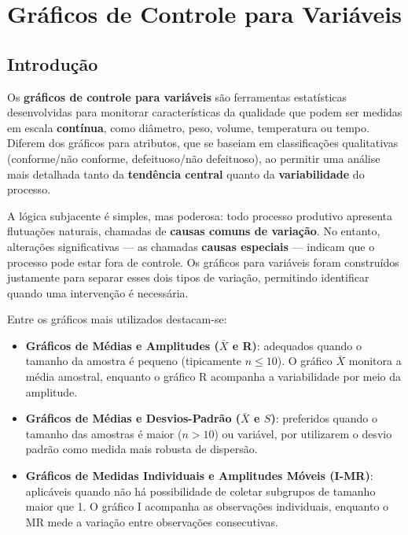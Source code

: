 \documentclass[
  portuguese,
  11pt,
  a4paper,
  DIV=11,
  numbers=noendperiod]{scrreprt}
\providecommand{\tightlist}{%
  \setlength{\itemsep}{0pt}\setlength{\parskip}{0pt}}
\begin{document}

\chapter{Gráficos de Controle para
Variáveis}\label{gruxe1ficos-de-controle-para-variuxe1veis}

\section{Introdução}\label{introduuxe7uxe3o}

Os \textbf{gráficos de controle para variáveis} são ferramentas
estatísticas desenvolvidas para monitorar características da qualidade
que podem ser medidas em escala \textbf{contínua}, como diâmetro, peso,
volume, temperatura ou tempo. Diferem dos gráficos para atributos, que
se baseiam em classificações qualitativas (conforme/não conforme,
defeituoso/não defeituoso), ao permitir uma análise mais detalhada tanto
da \textbf{tendência central} quanto da \textbf{variabilidade} do
processo.

A lógica subjacente é simples, mas poderosa: todo processo produtivo
apresenta flutuações naturais, chamadas de \textbf{causas comuns de
variação}. No entanto, alterações significativas --- as chamadas
\textbf{causas especiais} --- indicam que o processo pode estar fora de
controle. Os gráficos para variáveis foram construídos justamente para
separar esses dois tipos de variação, permitindo identificar quando uma
intervenção é necessária.

Entre os gráficos mais utilizados destacam-se:

\begin{itemize}
\tightlist
\item
  \textbf{Gráficos de Médias e Amplitudes (\(\bar{X}\) e R)}: adequados
  quando o tamanho da amostra é pequeno (tipicamente \(n \leq 10\)). O
  gráfico \(\bar{X}\) monitora a média amostral, enquanto o gráfico R
  acompanha a variabilidade por meio da amplitude.
\item
  \textbf{Gráficos de Médias e Desvios-Padrão (\(\bar{X}\) e \(S\))}:
  preferidos quando o tamanho das amostras é maior (\(n > 10\)) ou
  variável, por utilizarem o desvio padrão como medida mais robusta de
  dispersão.
\item
  \textbf{Gráficos de Medidas Individuais e Amplitudes Móveis (I-MR)}:
  aplicáveis quando não há possibilidade de coletar subgrupos de tamanho
  maior que 1. O gráfico I acompanha as observações individuais,
  enquanto o MR mede a variação entre observações consecutivas.
\end{itemize}
\end{document}
